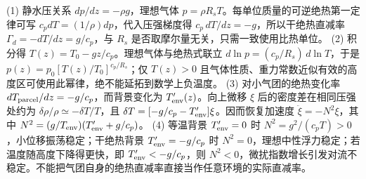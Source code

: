 (1) 静水压关系 \(dp/dz=-\rho g\)，理想气体 \(p=\rho R_sT\)。每单位质量的可逆绝热第一定律可写 \(c_p dT=(1/\rho)dp\)，代入压强梯度得 \(c_p\,dT/dz=-g\)，所以干绝热直减率 \(\Gamma_d=-dT/dz=g/c_p\)，与 \(R_s\) 是否取摩尔量无关，只需一致使用比热单位。
(2) 积分得 \(T(z)=T_0-gz/c_p\)。理想气体与绝热式联立 \(d\ln p=(c_p/R_s)\,d\ln T\)，于是 \(p(z)=p_0[T(z)/T_0]^{c_p/R_s}\)；仅 \(T(z)>0\) 且气体性质、重力常数近似有效的高度区可使用此幂律，绝不能延拓到数学上负温度。
(3) 对小气团的绝热变化率 \(dT_{\rm parcel}/dz=-g/c_p\)，而背景变化为 \(T_{\rm env}'(z)\)。向上微移 \(\xi\) 后的密度差在相同压强处约为 \(\delta\rho/\rho\simeq-\delta T/T\)，且 \(\delta T=[-g/c_p-T_{\rm env}']\xi\)。因而恢复加速度 \(\ddot\xi=-N^2\xi\)，其中 \(N^2=(g/T_{\rm env})(T_{\rm env}'+g/c_p)\)。
(4) 等温背景 \(T_{\rm env}'=0\) 时 \(N^2=g^2/(c_pT)>0\)，小位移振荡稳定；干绝热背景 \(T_{\rm env}'=-g/c_p\) 时 \(N^2=0\)，理想中性浮力稳定；若温度随高度下降得更快，即 \(T_{\rm env}'<-g/c_p\)，则 \(N^2<0\)，微扰指数增长引发对流不稳定。不能把气团自身的绝热直减率直接当作任意环境的实际直减率。
